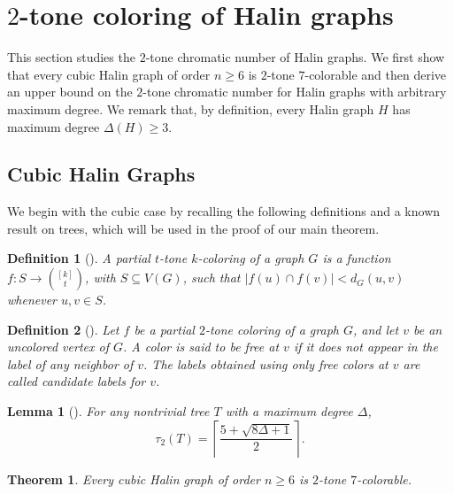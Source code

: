 \documentclass[12pt]{article}
\newtheorem{theorem}{Theorem}
\numberwithin{theorem}{section}
\numberwithin{conjecture}{section}
\numberwithin{corollary}{section}
\numberwithin{example}{section}
\newtheorem{lemma}{Lemma}
\numberwithin{lemma}{section}
\numberwithin{proposition}{section}
\numberwithin{problem}{section}
\numberwithin{remark}{section}
\numberwithin{claim}{theorem}
\newtheorem{definition}{Definition}
\numberwithin{definition}{section}
\begin{document}
\section{$2$-tone coloring of Halin graphs}

This section studies the $2$-tone chromatic number of Halin graphs. We first show that every cubic Halin graph of order $n \ge 6$ is $2$-tone $7$-colorable and then derive an upper bound on the $2$-tone chromatic number for Halin graphs with arbitrary maximum degree. We remark that, by definition, every Halin graph $H$ has maximum degree $\Delta(H)\ge 3$.

\subsection{Cubic Halin Graphs}

\noindent We begin with the cubic case by recalling the following definitions and a known result on trees, which will be used in the proof of our main theorem.

\begin{definition}[\cite{C1}]
A {\em partial $t$-tone $k$-coloring} of a graph $G$ is a function $f: S \rightarrow {[k] \choose t}$, with $S \subseteq V(G)$, such that $|f(u) \cap f(v)| < d_G(u,v)$ whenever $u,v \in S$. 
\end{definition}

\begin{definition}[\cite{C1}]
Let $f$ be a partial $2$-tone coloring of a graph $G$, and let $v$ be an uncolored vertex of $G$. A color is said to be \emph{free at $v$} if it does not appear in the label of any neighbor of $v$. The labels obtained using only free colors at $v$ are called \emph{candidate} labels for $v$.
\end{definition}

\begin{lemma}[\cite{BP,F}]\label{l4}
For any nontrivial tree $T$ with a maximum degree $\Delta$, 
\[
\tau_2(T) = \left\lceil \frac{5 + \sqrt{8\Delta + 1}}{2} \right\rceil.
\]
\end{lemma}

\begin{theorem}\label{t1'}
Every cubic Halin graph of order $n \ge 6$ is $2$-tone $7$-colorable.
\end{theorem}
\end{document}
